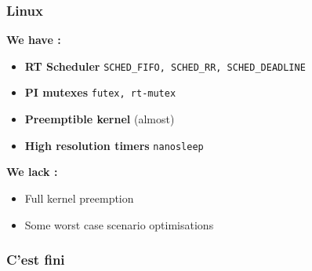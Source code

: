\documentclass{smilebeamer}
\begin{document}
\begin{frame}
	\frametitle{Linux}

	\textbf{We have :}

	\begin{itemize}
		\item \textbf{RT Scheduler} {\small{\texttt{SCHED\_FIFO, SCHED\_RR, SCHED\_DEADLINE}}}
		\item \textbf{PI mutexes} {\small{\texttt{futex, rt-mutex}}}
		\item \textbf{Preemptible kernel} (almost)
		\item \textbf{High resolution timers}  {\small{\texttt{nanosleep}}}
	\end{itemize}

	\textbf{We lack :}

	\begin{itemize}
		\item Full kernel preemption
		\item Some worst case scenario optimisations
	\end{itemize}
\end{frame}










\begin{frame}
	\frametitle{C'est fini}
\end{frame}
\end{document}
